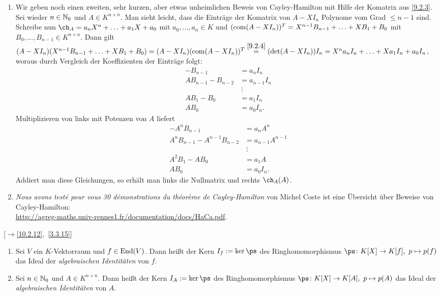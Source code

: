 \documentclass[../../main.tex]{subfiles}
\begin{document}
\begin{bem}
\begin{enumerate}[\normalfont(a)]
\item Wir geben noch einen zweiten, sehr kurzen, aber etwas unheimlichen Beweis von Cayley-Hamilton mit Hilfe der Komatrix aus \ref{9.2.3}. Sei wieder $n\in\mathbb N_0$ und
$A\in K^{n\times n}$. Man sieht leicht, dass die Einträge der Komatrix von $A-XI_n$ Polynome vom Grad $\le n-1$ sind. Schreibe nun
$\ch_A=a_nX^n+\ldots+a_1X+a_0$ mit $a_0,\dots,a_n\in K$ und $(\operatorname{com}(A-XI_n))^T=X^{n-1}B_{n-1}+\ldots+XB_1+B_0$ mit $B_0,\dots,B_{n-1}\in K^{n\times n}$. Dann gilt
$(A-XI_n)(X^{n-1}B_{n-1}+\ldots+XB_1+B_0)=(A-XI_n)(\operatorname{com}(A-XI_n))^T\overset{\ref{9.2.4}}=(\det(A-XI_n))I_n=X^na_nI_n+\ldots+Xa_1I_n+a_0I_n$, woraus durch Vergleich der
Koeffizienten der Einträge folgt:
\begin{align*}
-B_{n-1}&=a_nI_n\\
AB_{n-1}-B_{n-2}&=a_{n-1}I_n\\
&\ \vdots\\
AB_1-B_0&=a_1I_n\\
AB_0&=a_0I_n.
\end{align*}
Multiplizieren von links mit Potenzen von $A$ liefert
\begin{align*}
-A^nB_{n-1}&=a_nA^n\\
A^nB_{n-1}-A^{n-1}B_{n-2}&=a_{n-1}A^{n-1}\\
&\ \vdots\\
A^2B_1-AB_0&=a_1A\\
AB_0&=a_0I_n.
\end{align*}
Addiert man diese Gleichungen, so erhält man links die Nullmatrix und rechts $\ch_A(A)$.

\item \emph{Nous avons testé pour vous 30 démonstrations du théorème de Cayley-Hamilton} von Michel Coste ist eine Übersicht
über Beweise von Cayley-Hamilton:\\
\url{http://agreg-maths.univ-rennes1.fr/documentation/docs/HaCa.pdf}.
\end{enumerate}
\end{bem}


\begin{df}{\rm[$\to$\ref{10.2.12},~\ref{3.3.15}]}\label{10.2.16}
\begin{enumerate}[\normalfont(a)]
\item Sei $V$ ein $K$-Vektorraum und $f\in\operatorname{End}(V)$. Dann heißt der Kern $I_f:=\ker\ps$ des Ringhomomorphismus $\ps\colon K[X]\to K[f],\ p\mapsto p(f)$
das Ideal der \emph{algebraischen Identitäten} von $f$.
\item Sei $n\in\mathbb N_0$ und $A\in K^{n\times n}$. Dann heißt der Kern $I_A:=\ker\ps$ des Ringhomomorphismus $\ps\colon K[X]\to K[A],\ p\mapsto p(A)$ das Ideal der
\emph{algebraischen Identitäten} von $A$.
\end{enumerate}
\end{df}
\end{document}
